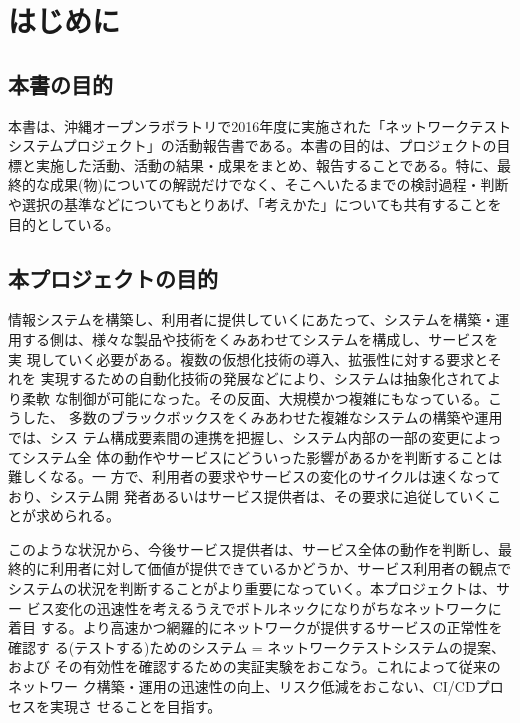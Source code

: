 
\chapter{はじめに}
\label{chap:abstract}

 \section{本書の目的}
 \label{sec:book-purpose}

本書は、沖縄オープンラボラトリで2016年度に実施された「ネットワークテスト
システムプロジェクト」の活動報告書である。本書の目的は、プロジェクトの目
標と実施した活動、活動の結果・成果をまとめ、報告することである。特に、最
終的な成果(物)についての解説だけでなく、そこへいたるまでの検討過程・判断
や選択の基準などについてもとりあげ、「考えかた」についても共有することを
目的としている。

 \section{本プロジェクトの目的}
 \label{sec:pj-purpose}


情報システムを構築し、利用者に提供していくにあたって、システムを構築・運
用する側は、様々な製品や技術をくみあわせてシステムを構成し、サービスを実
現していく必要がある。複数の仮想化技術の導入、拡張性に対する要求とそれを
実現するための自動化技術の発展などにより、システムは抽象化されてより柔軟
な制御が可能になった。その反面、大規模かつ複雑にもなっている。こうした、
多数のブラックボックスをくみあわせた複雑なシステムの構築や運用では、シス
テム構成要素間の連携を把握し、システム内部の一部の変更によってシステム全
体の動作やサービスにどういった影響があるかを判断することは難しくなる。一
方で、利用者の要求やサービスの変化のサイクルは速くなっており、システム開
発者あるいはサービス提供者は、その要求に追従していくことが求められる。

このような状況から、今後サービス提供者は、サービス全体の動作を判断し、最
終的に利用者に対して価値が提供できているかどうか、サービス利用者の観点で
システムの状況を判断することがより重要になっていく。本プロジェクトは、サー
ビス変化の迅速性を考えるうえでボトルネックになりがちなネットワークに着目
する。より高速かつ網羅的にネットワークが提供するサービスの正常性を確認す
る(テストする)ためのシステム = ネットワークテストシステムの提案、および
その有効性を確認するための実証実験をおこなう。これによって従来のネットワー
ク構築・運用の迅速性の向上、リスク低減をおこない、CI/CDプロセスを実現さ
せることを目指す。

